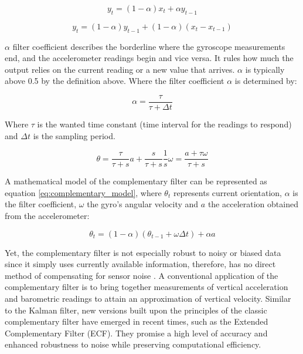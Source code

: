 \begin{equation}
    y_t = (1-\alpha)x_{t} + \alpha y_{t-1}
    \label{eq:low_pass_filter}
\end{equation}

\begin{equation}
    y_t = (1-\alpha)y_{t-1} + (1-\alpha) (x_t - x_{t-1})
    \label{eq:high_pass_filter}
\end{equation}

$\alpha$ filter coefficient describes the borderline where the gyroscope measurements end, and the accelerometer readings begin and vice versa. It rules how much the output relies on the current reading or a new value that arrives. $\alpha$ is typically above 0.5 by the definition above. Where the filter coefficient $\alpha$ is determined by:

\begin{equation}
    \alpha = \frac{\tau}{\tau + \Delta t}
\end{equation}

Where $\tau$ is the wanted time constant (time interval for the readings to respond) and $\Delta t$ is the sampling period.

\begin{equation}
    \theta = \frac{\tau}{\tau + s}a + \frac{s}{\tau + s}\frac{1}{s}\omega = \frac{a+\tau \omega}{\tau + s}
\end{equation}

A mathematical model of the complementary filter can be represented as equation \ref{eq:complementary_model}, where $\theta_t$ represents current orientation, $\alpha$ is the filter coefficient, $\omega$ the gyro's angular velocity and $a$ the acceleration obtained from the accelerometer:

\begin{equation}
    \theta_t = (1 - \alpha) (\theta_{t-1} + \omega \Delta t) + \alpha a
    \label{eq:complementary_model}
\end{equation}

Yet, the complementary filter is not especially robust to noisy or biased data since it simply uses currently available information, therefore, has no direct method of compensating for sensor noise \cite{wilson2019formulation}. A conventional application of the complementary filter is to bring together measurements of vertical acceleration and barometric readings to attain an approximation of vertical velocity. Similar to the Kalman filter, new versions built upon the principles of the classic complementary filter have emerged in recent times, such as the Extended Complementary Filter (ECF). They promise a high level of accuracy and enhanced robustness to noise while preserving computational efficiency.


